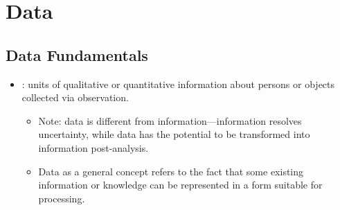 \chapter{Data}

\section{Data Fundamentals}
\begin{itemize}
  \item {}: units of qualitative or quantitative information about persons or objects collected via observation.
    \begin{itemize}
      \item Note: data is different from information---information resolves uncertainty, while data has the potential to be transformed into information post-analysis.
      \item Data as a general concept refers to the fact that some existing information or knowledge can be represented in a form suitable for processing.
    \end{itemize}


\end{itemize}
